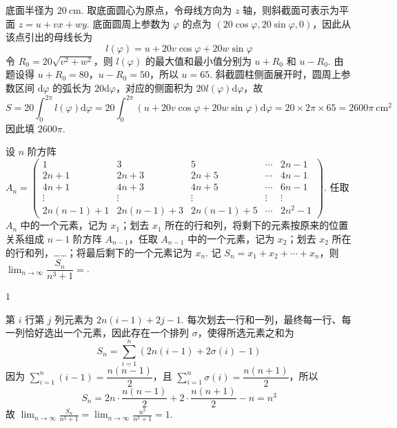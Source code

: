 \begin{solution}
底面半径为 \(20\mathrm{~cm}\). 取底面圆心为原点，令母线方向为 \(z\) 轴，则斜截面可表示为平面 \(z=u+vx+wy\). 底面圆周上参数为 \(\varphi\) 的点为 \((20\cos\varphi,20\sin\varphi,0)\)，因此从该点引出的母线长为
\[
l(\varphi)=u+20v\cos\varphi+20w\sin\varphi
\]
令 \(R_0=20\sqrt{v^2+w^2}\)，则 \(l(\varphi)\) 的最大值和最小值分别为 \(u+R_0\) 和 \(u-R_0\). 由题设得 \(u+R_0=80\)，\(u-R_0=50\)，所以 \(u=65\). 斜截圆柱侧面展开时，圆周上参数区间 \(\mathrm d\varphi\) 的弧长为 \(20\mathrm d\varphi\)，对应的侧面积为 \(20l(\varphi)\mathrm d\varphi\)，故
\[
S=20\int_0^{2\pi}l(\varphi)\mathrm d\varphi=20\int_0^{2\pi}\left(u+20v\cos\varphi+20w\sin\varphi\right)\mathrm d\varphi=20\times2\pi\times65=2600\pi\mathrm{~cm}^2
\]
因此填 \(2600\pi\).
\end{solution}

\begin{problem}
设 \(n\) 阶方阵 \(A_n=\begin{pmatrix} 1 & 3 & 5 & \cdots & 2n-1 \\ 2n+1 & 2n+3 & 2n+5 & \cdots & 4n-1 \\ 4n+1 & 4n+3 & 4n+5 & \cdots & 6n-1 \\ \vdots & \vdots & \vdots & \vdots & \vdots \\ 2n(n-1)+1 & 2n(n-1)+3 & 2n(n-1)+5 & \cdots & 2n^2-1 \end{pmatrix}\). 任取 \(A_n\) 中的一个元素，记为 \(x_1\)；划去 \(x_1\) 所在的行和列，将剩下的元素按原来的位置关系组成 \(n-1\) 阶方阵 \(A_{n-1}\)，任取 \(A_{n-1}\) 中的一个元素，记为 \(x_2\)；划去 \(x_2\) 所在的行和列，……；将最后剩下的一个元素记为 \(x_n\). 记 \(S_n=x_1+x_2+\cdots+x_n\)，则 \(\displaystyle\lim_{n\to\infty}\dfrac{S_n}{n^3+1}=\)\fillinblank{}.
\end{problem}

\begin{answer}
\(1\)
\end{answer}

\begin{solution}
第 \(i\) 行第 \(j\) 列元素为 \(2n(i-1)+2j-1\). 每次划去一行和一列，最终每一行、每一列恰好选出一个元素，因此存在一个排列 \(\sigma\)，使得所选元素之和为
\[
S_n=\sum_{i=1}^n\left(2n(i-1)+2\sigma(i)-1\right)
\]
因为 \(\sum_{i=1}^n(i-1)=\dfrac{n(n-1)}{2}\)，且 \(\sum_{i=1}^n\sigma(i)=\dfrac{n(n+1)}{2}\)，所以
\[
S_n=2n\cdot\frac{n(n-1)}{2}+2\cdot\frac{n(n+1)}{2}-n=n^3
\]
故 \(\displaystyle\lim_{n\to\infty}\frac{S_n}{n^3+1}=\lim_{n\to\infty}\frac{n^3}{n^3+1}=1\).
\end{solution}

